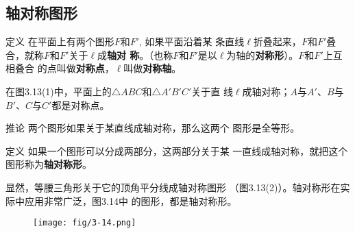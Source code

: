 \subsection{轴对称图形}
\begin{blk}{定义}
    在平面上有两个图形$F$和$F'$, 如果平面沿着某
条直线$\ell$折叠起来，$F$和$F'$叠合，就称$F$和$F'$关于$\ell$成\textbf{轴对
称}。（也称$F$和$F'$是以$\ell$为轴的\textbf{对称形}）。$F$和$F'$上互相叠合
的点叫做\textbf{对称点}，$\ell$叫做\textbf{对称轴}。
\end{blk}

在图3.13(1)中，平面上的$\triangle ABC$和$\triangle A'B'C'$关于直
线$\ell$成轴对称；$A$与$A'$、$B$与$B'$、$C$与$C'$都是对称点。

\begin{figure}[htp]
    \centering
{}
    \caption{}
\end{figure}

\begin{blk}{推论}
     两个图形如果关于某直线成轴对称，那么这两个
图形是全等形。
\end{blk}

\begin{blk}{定义}
    如果一个图形可以分成两部分，这两部分关于某
一直线成轴对称，就把这个图形称为\textbf{轴对称形}。
\end{blk}

显然，等腰三角形关于它的顶角平分线成轴对称图形
（图3.13(2)）。轴对称形在实际中应用非常广泛，图3.14中
的图形，都是轴对称形。
\begin{figure}[htp]
    \centering
\texttt{[image: fig/3-14.png]}
    \caption{}
\end{figure}

